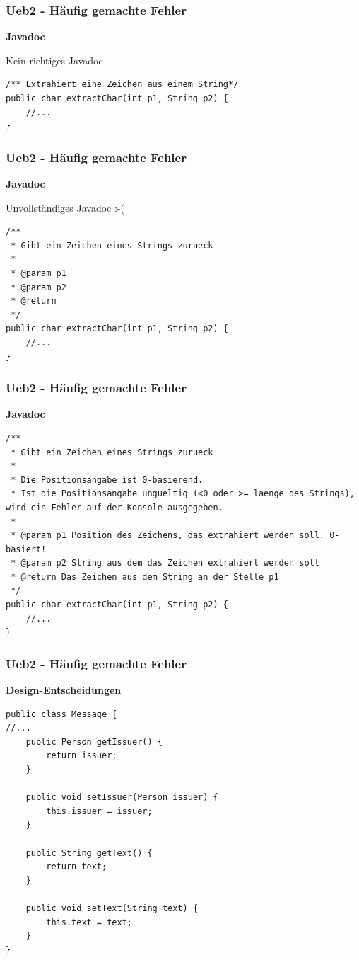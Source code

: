 \documentclass[18pt]{beamer}
\begin{document}

\begin{frame}[containsverbatim]
	\frametitle{Ueb2 - Häufig gemachte Fehler}
		\textbf{Javadoc}
		
		Kein richtiges Javadoc
		
		\begin{lstlisting}
/** Extrahiert eine Zeichen aus einem String*/
public char extractChar(int p1, String p2) {
	//...
}
		\end{lstlisting}
\end{frame}



\begin{frame}[containsverbatim]
	\frametitle{Ueb2 - Häufig gemachte Fehler}
		\textbf{Javadoc}
		
		Unvollständiges Javadoc :-(
		
		\begin{lstlisting}
/**
 * Gibt ein Zeichen eines Strings zurueck
 *
 * @param p1 
 * @param p2 
 * @return
 */
public char extractChar(int p1, String p2) {
	//...
}
		\end{lstlisting}
\end{frame}


\begin{frame}[containsverbatim]
\frametitle{Ueb2 - Häufig gemachte Fehler}
		\textbf{Javadoc}
		
		\begin{lstlisting}
/**
 * Gibt ein Zeichen eines Strings zurueck
 *
 * Die Positionsangabe ist 0-basierend.
 * Ist die Positionsangabe ungueltig (<0 oder >= laenge des Strings), wird ein Fehler auf der Konsole ausgegeben.
 *
 * @param p1 Position des Zeichens, das extrahiert werden soll. 0-basiert!
 * @param p2 String aus dem das Zeichen extrahiert werden soll
 * @return Das Zeichen aus dem String an der Stelle p1
 */
public char extractChar(int p1, String p2) {
	//...
}
		\end{lstlisting}
\end{frame}

\begin{frame}[containsverbatim]
\frametitle{Ueb2 - Häufig gemachte Fehler}
		\textbf{Design-Entscheidungen}
		
		\begin{lstlisting}
public class Message {
//...	
	public Person getIssuer() {
		return issuer;
	}
	
	public void setIssuer(Person issuer) {
		this.issuer = issuer;
	}
	
	public String getText() {
		return text;
	}
	
	public void setText(String text) {
		this.text = text;
	}
}
		\end{lstlisting}
\end{frame}
\end{document}
